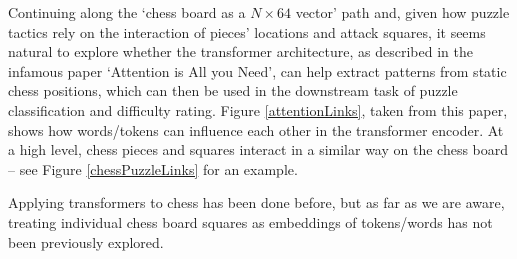 Continuing along the `chess board as a $N\times64$ vector' path and, given how
puzzle tactics rely on the interaction of pieces' locations and attack squares,
it seems natural to explore whether the transformer architecture, as described
in the infamous paper `Attention is All you Need',\cite{attention} can help
extract patterns from static chess positions, which can then be used in the
downstream task of puzzle classification and difficulty rating. Figure
\ref{attentionLinks}, taken from this paper, shows how words/tokens can
influence each other in the transformer encoder. At a high level, chess pieces
and squares interact in a similar way on the chess board -- see Figure
\ref{chessPuzzleLinks} for an example.

Applying transformers to chess has been done before,\cite{chessTransformer} but
as far as we are aware, treating individual chess board squares as embeddings
of tokens/words has not been previously explored.

